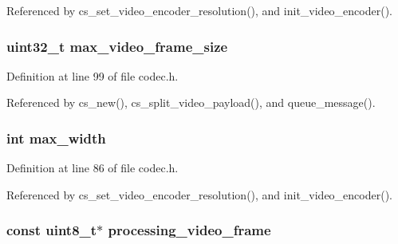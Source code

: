 Referenced by cs\+\_\+set\+\_\+video\+\_\+encoder\+\_\+resolution(), and init\+\_\+video\+\_\+encoder().

\hypertarget{struct___c_s_session_a4de5a61c775468baabb35e2fcfaaa3a2}{
\subsubsection[{max\+\_\+video\+\_\+frame\+\_\+size}]{\setlength{\rightskip}{0pt plus 5cm}uint32\+\_\+t max\+\_\+video\+\_\+frame\+\_\+size}}\label{struct___c_s_session_a4de5a61c775468baabb35e2fcfaaa3a2}


Definition at line 99 of file codec.\+h.



Referenced by cs\+\_\+new(), cs\+\_\+split\+\_\+video\+\_\+payload(), and queue\+\_\+message().

\hypertarget{struct___c_s_session_aa224a991c08c1d696a040a415d6a4a92}{
\subsubsection[{max\+\_\+width}]{\setlength{\rightskip}{0pt plus 5cm}int max\+\_\+width}}\label{struct___c_s_session_aa224a991c08c1d696a040a415d6a4a92}


Definition at line 86 of file codec.\+h.



Referenced by cs\+\_\+set\+\_\+video\+\_\+encoder\+\_\+resolution(), and init\+\_\+video\+\_\+encoder().

\hypertarget{struct___c_s_session_ae94ea43be63edb42efe44edae585064e}{
\subsubsection[{processing\+\_\+video\+\_\+frame}]{\setlength{\rightskip}{0pt plus 5cm}const uint8\+\_\+t$\ast$ processing\+\_\+video\+\_\+frame}}\label{struct___c_s_session_ae94ea43be63edb42efe44edae585064e}


